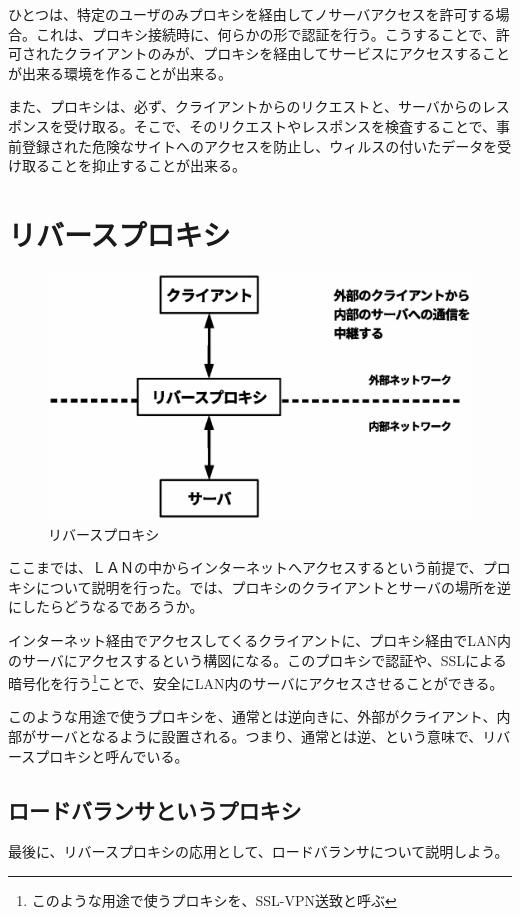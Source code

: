 ひとつは、特定のユーザのみプロキシを経由してノサーバアクセスを許可する場合。これは、プロキシ接続時に、何らかの形で認証を行う。こうすることで、許可されたクライアントのみが、プロキシを経由してサービスにアクセスすることが出来る環境を作ることが出来る。

また、プロキシは、必ず、クライアントからのリクエストと、サーバからのレスポンスを受け取る。そこで、そのリクエストやレスポンスを検査することで、事前登録された危険なサイトへのアクセスを防止し、ウィルスの付いたデータを受け取ることを抑止することが出来る。

\section{リバースプロキシ}

\begin{figure}[htbp]
	\includegraphics[width=12cm,clip]{draw/fig6.eps}
	\caption{リバースプロキシ}
	\label{fig:reverse-proxy}
\end{figure}

ここまでは、ＬＡＮの中からインターネットへアクセスするという前提で、プロキシについて説明を行った。では、プロキシのクライアントとサーバの場所を逆にしたらどうなるであろうか。

インターネット経由でアクセスしてくるクライアントに、プロキシ経由でLAN内のサーバにアクセスするという構図になる。このプロキシで認証や、SSLによる暗号化を行う\footnote{このような用途で使うプロキシを、SSL-VPN送致と呼ぶ}ことで、安全にLAN内のサーバにアクセスさせることができる。

このような用途で使うプロキシを、通常とは逆向きに、外部がクライアント、内部がサーバとなるように設置される。つまり、通常とは逆、という意味で、リバースプロキシと呼んでいる。

\subsection{ロードバランサというプロキシ}
最後に、リバースプロキシの応用として、ロードバランサについて説明しよう。

